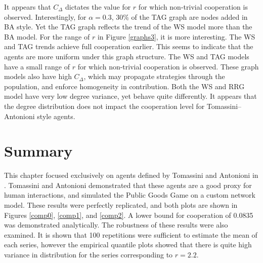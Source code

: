 It appears that $C_\Delta$ dictates the value for $r$ for which non-trivial cooperation is observed. Interestingly, for $\alpha = 0.3$, 30\% of the TAG graph are nodes added in BA style. Yet the TAG graph reflects the trend of the WS model more than the BA model.
\FloatBarrier
{}
\FloatBarrier
{}
\FloatBarrier
For the range of $r$ in Figure \ref{graphs3}, it is more interesting. The WS and TAG trends achieve full cooperation earlier. This seems to indicate that the agents are more uniform under this graph structure. The WS and TAG models have a small range of $r$ for which non-trivial cooperation is observed. These graph models also have high $C_\Delta$, which may propagate strategies through the population, and enforce homogeneity in contribution. Both the WS and RRG model have very low degree variance, yet behave quite differently. It appears that the degree distribution does not impact the cooperation level for Tomassini--Antonioni style agents. \\

\section{Summary}

This chapter focused exclusively on agents defined by Tomassini and Antonioni in \cite{RN49}. Tomassini and Antonioni demonstrated that these agents are a good proxy for human interactions, and simulated the Public Goods Game on a custom network model. These results were perfectly replicated, and both plots are shown in Figures \ref{comp0}, \ref{comp1}, and \ref{comp2}.  A lower bound for cooperation of 0.0835 was demonstrated analytically. The robustness of these results were also examined. It is shown that 100 repetitions were sufficient to estimate the mean of each series, however the empirical quantile plots showed that there is quite high variance in distribution for the series corresponding to $r=2.2$.\\ 

